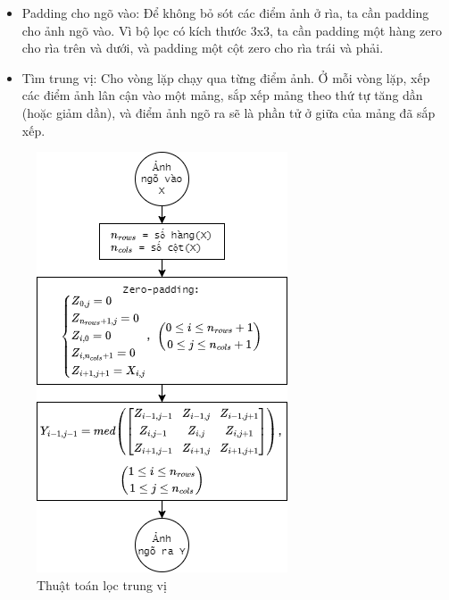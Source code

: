\begin{itemize}
    \item Padding cho ngõ vào: Để không bỏ sót các điểm ảnh ở rìa, ta cần padding cho ảnh ngõ vào. 
    Vì bộ lọc có kích thước 3x3, ta cần padding một hàng zero cho rìa trên và dưới, 
    và padding một cột zero cho rìa trái và phải.

    \item Tìm trung vị: Cho vòng lặp chạy qua từng điểm ảnh. Ở mỗi vòng lặp, xếp các điểm ảnh lân cận vào một mảng, sắp xếp mảng theo thứ tự tăng dần (hoặc giảm dần), và điểm ảnh ngõ ra sẽ là phần tử ở giữa của mảng đã sắp xếp.
\end{itemize}

\begin{figure}[H]
    \centering
    \includegraphics[width=.65\linewidth]{../images/median_filtering_algorithm.png}
    \caption{Thuật toán lọc trung vị}
    \label{fig:median_filtering_algorithm}
\end{figure}

